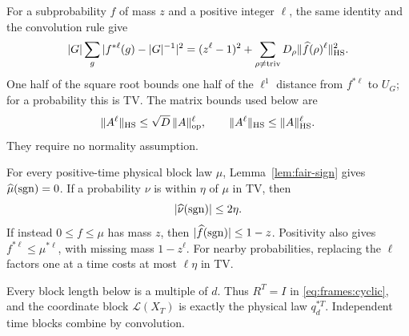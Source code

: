 For a subprobability \(f\) of mass \(z\) and a positive integer \(\ell\),
the same identity and the convolution rule give
\begin{equation}
 |G|\sum_g|f^{*\ell}(g)-|G|^{-1}|^2
 =(z^\ell-1)^2+
 \sum_{\rho\ne\mathrm{triv}}D_\rho
             \|\widehat f(\rho)^\ell\|_{\mathrm{HS}}^2.
 \label{shear:eq:subprob-plancherel}
\end{equation}
One half of the square root bounds one half of the \(\ell^1\) distance
from \(f^{*\ell}\) to \(U_G\); for a probability this is TV.
The matrix bounds used below are
\[
 \|A^\ell\|_{\mathrm{HS}}\le\sqrt D\,\|A\|_{\mathrm{op}}^{\ell},
 \qquad
 \|A^\ell\|_{\mathrm{HS}}\le\|A\|_{\mathrm{HS}}^{\ell}.
\]
They require no normality assumption.

For every positive-time physical block law \(\mu\),
Lemma~\ref{lem:fair-sign} gives \(\widehat\mu(\operatorname{sgn})=0\).
If a probability \(\nu\) is within \(\eta\) of \(\mu\) in TV, then
\begin{equation}
 |\widehat\nu(\operatorname{sgn})|\le2\eta.
 \label{shear:eq:parity}
\end{equation}
If instead \(0\le f\le\mu\) has mass \(z\), then
\(|\widehat f(\operatorname{sgn})|\le1-z\). Positivity also gives
\(f^{*\ell}\le\mu^{*\ell}\), with missing mass \(1-z^\ell\).
For nearby probabilities, replacing the \(\ell\) factors one at a time
costs at most \(\ell\eta\) in TV.

Every block length below is a multiple of \(d\). Thus
\(R^T=I\) in \eqref{eq:frames:cyclic}, and the coordinate block
\(\mathcal L(X_T)\) is exactly the physical law \(q_d^{*T}\).
Independent time blocks combine by convolution.

